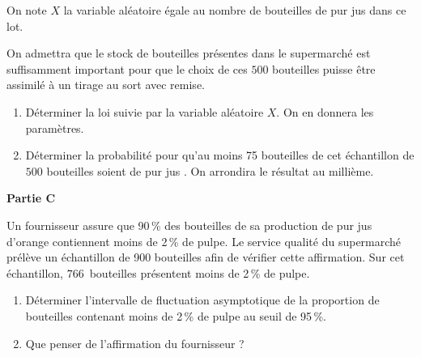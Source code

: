 \documentclass[12pt,frenchb]{article}
\begin{document}
\begin{question}[subtitle={Antilles Guyane septembre 2015}]
On note $X$ la variable aléatoire égale au nombre de bouteilles de \og pur jus \fg{} dans ce lot.

On admettra que le stock de bouteilles présentes dans le supermarché est suffisamment important pour que le choix de ces $500$ bouteilles puisse être assimilé à un tirage au sort avec remise.

\medskip

\begin{enumerate}
\item Déterminer la loi suivie par la variable aléatoire $X$. On en donnera les paramètres.
\item Déterminer la probabilité pour qu'au moins 75 bouteilles de cet échantillon de $500$ bouteilles soient de \og pur jus \fg. On arrondira le résultat au millième.
\end{enumerate}

\bigskip

\textbf{Partie C}

\medskip

Un fournisseur assure que 90\,\% des bouteilles de sa production de pur jus d'orange contiennent moins de 2\,\% de pulpe. Le service qualité du supermarché prélève un échantillon de 900 bouteilles afin de vérifier cette affirmation. Sur cet échantillon, $766$~bouteilles présentent moins de 2\,\% de pulpe.

\medskip

\begin{enumerate}
\item Déterminer l'intervalle de fluctuation asymptotique de la proportion de bouteilles contenant moins de 2\,\% de pulpe au seuil de 95\,\%.
\item Que penser de l'affirmation du fournisseur ?
\end{enumerate}

\end{question}
\end{document}
